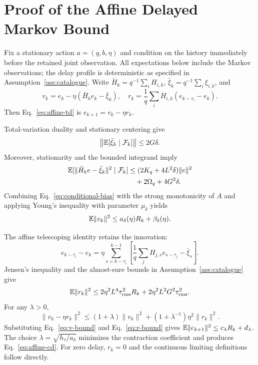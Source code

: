 \section{Proof of the Affine Delayed Markov Bound}
\label{app:affine}
Fix a stationary action $a=(q,b,\eta)$ and condition on the history immediately before the retained joint observation.
All expectations below include the Markov observations; the delay profile is deterministic as specified in Assumption~\ref{ass:catalogue}.
Write $\bar H_k=q^{-1}\sum_iH_{i,k}$, $\bar\xi_k=q^{-1}\sum_i\xi_{i,k}$, and
\begin{equation}
v_k=e_k-\eta(\bar H_ke_k-\bar\xi_k),
\quad
r_k=\frac1q\sum_iH_{i,k}(e_{k-\tau_i}-e_k).
\label{eq:appendix-vr}
\end{equation}
Then Eq.~\eqref{eq:affine-td} is $e_{k+1}=v_k-\eta r_k$.

Total-variation duality and stationary centering give
\begin{equation}
\left\|\mathbb{E}[\bar\xi_k\mid\mathcal{F}_k]\right\|\le2G\delta.
\label{eq:conditional-bias}
\end{equation}
Moreover, stationarity and the bounded integrand imply
\begin{align}
\mathbb{E}[\|\bar H_ke-\bar\xi_k\|^2\mid\mathcal{F}_k]
&\le(2K_q+4L^2\delta)\|e\|^2\nonumber\\
&\quad+2\Omega_q+4G^2\delta.
\label{eq:second-moment-transfer}
\end{align}
Combining Eq.~\eqref{eq:conditional-bias} with the strong monotonicity of $A$ and applying Young's inequality with parameter $\mu_\delta$ yields
\begin{equation}
\mathbb{E}\|v_k\|^2\le a_\delta(\eta)R_k+\beta_\delta(\eta).
\label{eq:v-bound}
\end{equation}

The affine telescoping identity retains the innovation:
\begin{equation}
e_{k-\tau_i}-e_k=\eta\sum_{s=k-\tau_i}^{k-1}\left[\frac1q\sum_jH_{j,s}e_{s-\tau_j}-\bar\xi_s\right].
\end{equation}
Jensen's inequality and the almost-sure bounds in Assumption~\ref{ass:catalogue} give
\begin{equation}
\mathbb{E}\|r_k\|^2\le2\eta^2L^4\tau_{\rm rms}^2R_k+2\eta^2L^2G^2\tau_{\rm rms}^2.
\label{eq:r-bound}
\end{equation}
For any $\lambda>0$,
\begin{equation}
\|v_k-\eta r_k\|^2\le(1+\lambda)\|v_k\|^2+(1+\lambda^{-1})\eta^2\|r_k\|^2.
\end{equation}
Substituting Eq.~\eqref{eq:v-bound} and Eq.~\eqref{eq:r-bound} gives $\mathbb{E}\|e_{k+1}\|^2\le c_\lambda R_k+d_\lambda$.
The choice $\lambda=\sqrt{h_\tau/a_\delta}$ minimizes the contraction coefficient and produces Eq.~\eqref{eq:affine-cd}.
For zero delay, $r_k=0$ and the continuous limiting definitions follow directly.


